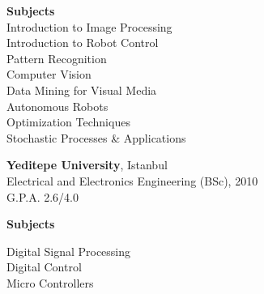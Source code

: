 \documentclass[margin]{res}
\begin{document}
\begin{resume}
		\begin{ncolumn}{1}
			
			{\bf Subjects} \\
			Introduction to Image Processing \\
			Introduction to Robot Control\\
			Pattern Recognition \\
			Computer Vision \\
			Data Mining for Visual Media \\
			Autonomous Robots \\
			Optimization Techniques \\
			Stochastic Processes \& Applications
		\end{ncolumn}
		
		
		{\bf Yeditepe University}, Istanbul \\
		Electrical and Electronics Engineering (BSc), 2010 \\
		G.P.A. 2.6/4.0 
		
		\begin{ncolumn}{1}
			{\bf Subjects}
			
			Digital Signal Processing \\
			Digital Control \\
			Micro Controllers
		\end{ncolumn}
		
		

\end{resume}
\end{document}
